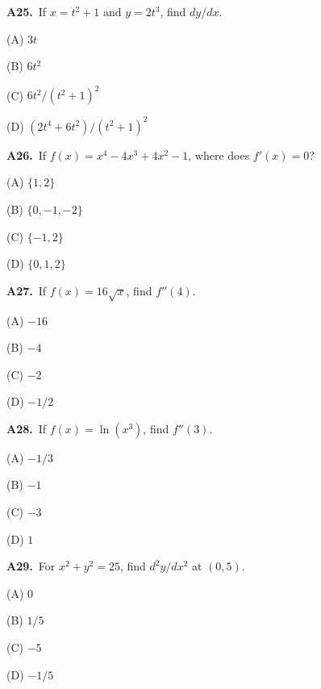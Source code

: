 \documentclass[11pt]{article}
\begin{document}
\bigskip\noindent\textbf{A25.}\ If $x=t^2+1$ and $y=2t^3$, find $dy/dx$.
\begin{list}{}{\setlength{\leftmargin}{3em}\setlength{\labelwidth}{2.5em}\setlength{\itemsep}{0pt}\setlength{\topsep}{2pt}}
\item[(A)] $3t$
\item[(B)] $6t^2$
\item[(C)] $6t^2/(t^2+1)^2$
\item[(D)] $(2t^4+6t^2)/(t^2+1)^2$
\end{list}

\bigskip\noindent\textbf{A26.}\ If $f(x)=x^4-4x^3+4x^2-1$, where does $f'(x)=0$?
\begin{list}{}{\setlength{\leftmargin}{3em}\setlength{\labelwidth}{2.5em}\setlength{\itemsep}{0pt}\setlength{\topsep}{2pt}}
\item[(A)] $\{1,2\}$
\item[(B)] $\{0,-1,-2\}$
\item[(C)] $\{-1,2\}$
\item[(D)] $\{0,1,2\}$
\end{list}

\bigskip\noindent\textbf{A27.}\ If $f(x)=16\sqrt{x}$, find $f''(4)$.
\begin{list}{}{\setlength{\leftmargin}{3em}\setlength{\labelwidth}{2.5em}\setlength{\itemsep}{0pt}\setlength{\topsep}{2pt}}
\item[(A)] $-16$
\item[(B)] $-4$
\item[(C)] $-2$
\item[(D)] $-1/2$
\end{list}

\bigskip\noindent\textbf{A28.}\ If $f(x)=\ln(x^3)$, find $f''(3)$.
\begin{list}{}{\setlength{\leftmargin}{3em}\setlength{\labelwidth}{2.5em}\setlength{\itemsep}{0pt}\setlength{\topsep}{2pt}}
\item[(A)] $-1/3$
\item[(B)] $-1$
\item[(C)] $-3$
\item[(D)] $1$
\end{list}

\bigskip\noindent\textbf{A29.}\ For $x^2+y^2=25$, find $d^2y/dx^2$ at $(0,5)$.
\begin{list}{}{\setlength{\leftmargin}{3em}\setlength{\labelwidth}{2.5em}\setlength{\itemsep}{0pt}\setlength{\topsep}{2pt}}
\item[(A)] $0$
\item[(B)] $1/5$
\item[(C)] $-5$
\item[(D)] $-1/5$
\end{list}
\end{document}
